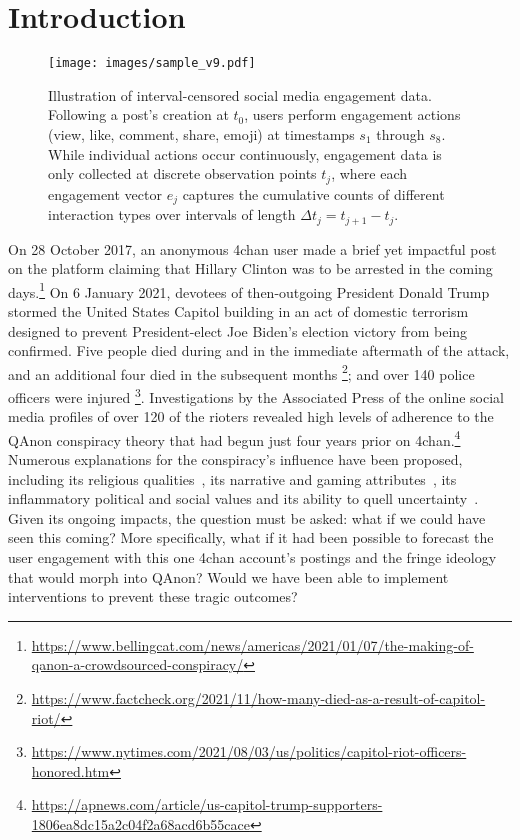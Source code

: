 
\section{Introduction}

\begin{figure}[tbp]
  \centering
  \texttt{[image: images/sample\_v9.pdf]}
  \caption{
    Illustration of interval-censored social media engagement data. Following a post's creation at $t_0$, users perform engagement actions (view, like, comment, share, emoji) at timestamps $s_1$ through $s_8$. While individual actions occur continuously, engagement data is only collected at discrete observation points $t_j$, where each engagement vector $e_j$ captures the cumulative counts of different interaction types over intervals of length $\Delta t_j = t_{j+1} - t_j$.
  }
  \label{fig:sample_ic_mamba}
\end{figure}


On 28 October 2017, an anonymous 4chan user made a brief yet impactful post on the platform claiming that Hillary Clinton was to be arrested in the coming days.\footnote{\url{https://www.bellingcat.com/news/americas/2021/01/07/the-making-of-qanon-a-crowdsourced-conspiracy/}}
On 6 January 2021, devotees of then-outgoing President Donald Trump stormed the United States Capitol building in an act of domestic terrorism designed to prevent President-elect Joe Biden's election victory from being confirmed. Five people died during and in the immediate aftermath of the attack, and an additional four died in the subsequent months \footnote{\url{https://www.factcheck.org/2021/11/how-many-died-as-a-result-of-capitol-riot/}}; and over 140 police officers were injured \footnote{\url{https://www.nytimes.com/2021/08/03/us/politics/capitol-riot-officers-honored.htm}}. 
Investigations by the Associated Press of the online social media profiles of over 120 of the rioters revealed high levels of adherence to the QAnon conspiracy theory that had begun just four years prior on 4chan.\footnote{\url{https://apnews.com/article/us-capitol-trump-supporters-1806ea8dc15a2c04f2a68acd6b55cace}}
Numerous explanations for the conspiracy's influence have been proposed, including its religious qualities~\citep{macmillen2022qanon}, its narrative and gaming attributes~\citep{haiven2022interview}, its inflammatory political and social values and its ability to quell uncertainty~\citep{young2022authoritarian}.
Given its ongoing impacts, the question must be asked: what if we could have seen this coming? More specifically, what if it had been possible to forecast the user engagement with this one 4chan account's postings and the fringe ideology that would morph into QAnon? Would we have been able to implement interventions to prevent these tragic outcomes?


